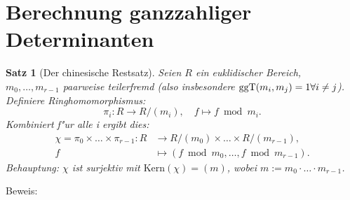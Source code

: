 \documentclass{article}
\newtheorem{Sat}{Satz}
\newcommand{\ggt}[2]{\ensuremath{\mathrm{ggT}(#1,#2)}}
\newcommand{\Kern}[1]{\ensuremath{\mathrm{Kern}(#1)}}
\begin{document}

\section*{Berechnung ganzzahliger Determinanten}

\begin{Sat}[Der chinesische Restsatz]
Seien $R$ ein euklidischer Bereich, \\
$m_0,\dots,m_{r-1}$ paarweise teilerfremd (also insbesondere $\ggt{m_i}{m_j}=1 \\
\forall i \ne j$). Definiere Ringhomomorphismus:
$$ \pi_i : R \longrightarrow R / (m_i), \quad f \longmapsto f\bmod m_i .$$
Kombiniert f"ur alle i ergibt dies:
\begin{equation*}
	\begin{split}
		\chi = \pi_0 \times \dots \times \pi_{r-1} : R& \longrightarrow R / (m_0) \times \dots \times R / 	(m_{r-1}),\\
		f& \longmapsto (f \bmod m_0, \dots , f \bmod m_{r-1}).
	\end{split}
\end{equation*}
Behauptung: $\chi$ ist surjektiv mit $\Kern{\chi}=(m)$, wobei $m := m_0 \cdot \dotso \cdot m_{r-1}$.
\end{Sat}
Beweis:
\end{document}
